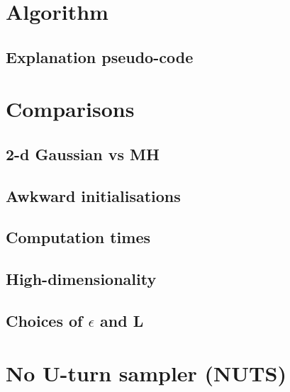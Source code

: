 \documentclass[12pt]{article}
\begin{document}
\section{Algorithm}
\subsection{Explanation pseudo-code}

\section{Comparisons}
\subsection{2-d Gaussian vs MH}
\subsection{Awkward initialisations}
\subsection{Computation times}
\subsection{High-dimensionality}
\subsection{Choices of $\epsilon$ and L}

\section{No U-turn sampler (NUTS)}



\end{document}
